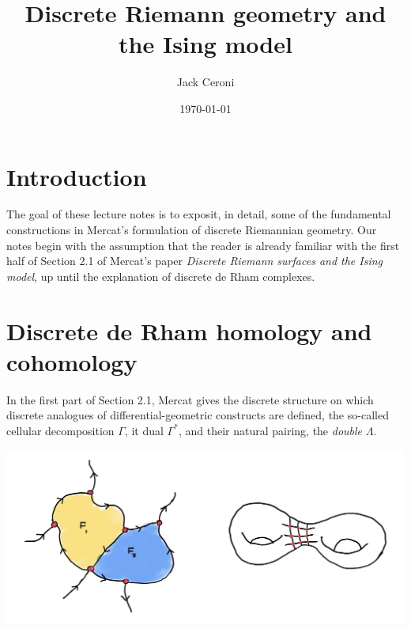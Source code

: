 \documentclass[aps,pra,showpacs,notitlepage,onecolumn,superscriptaddress,nofootinbib]{revtex4-1}
\theoremstyle{definition}
\begin{document}
\title{Discrete Riemann geometry and the Ising model}
\author{Jack Ceroni}

\date{\today}

\maketitle

\section{Introduction}

\noindent The goal of these lecture notes is to exposit, in detail, some of the fundamental constructions in Mercat's formulation of discrete Riemannian geometry.
Our notes begin with the assumption that the reader is already familiar with the first half of Section 2.1 of Mercat's paper \emph{Discrete Riemann surfaces and the Ising model},
up until the explanation of discrete de Rham complexes.

\section{Discrete de Rham homology and cohomology}

\noindent In the first part of Section 2.1, Mercat gives the discrete structure on which discrete analogues of differential-geometric
constructs are defined, the so-called cellular decomposition $\Gamma$, it dual $\Gamma^{*}$, and their natural pairing, the \emph{double} $\Lambda$.

\begin{center}
  \includegraphics[width=\textwidth]{./assets/mercat1.jpeg}
\end{center}
\end{document}
